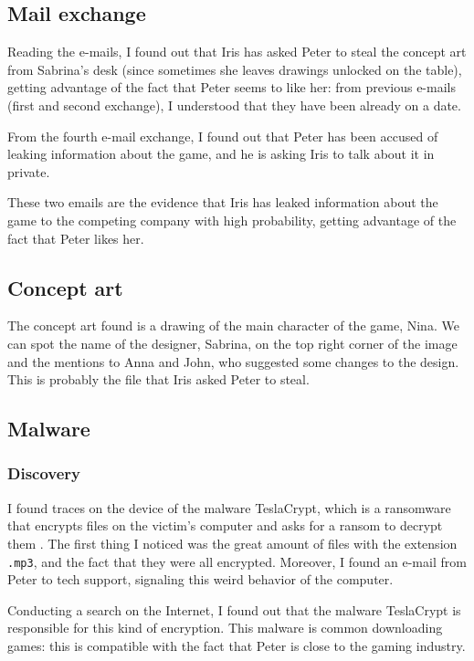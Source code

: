 \documentclass[12pt]{article}
\begin{document}
\subsection{Mail exchange}
\label{sec:mail}

Reading the e-mails, I found out that Iris has asked Peter to steal the concept art from Sabrina's desk (since sometimes she leaves drawings unlocked on the table), getting advantage of the fact that Peter seems to like her: from previous e-mails (first and second exchange), I understood that they have been already on a date.

From the fourth e-mail exchange, I found out that Peter has been accused of leaking information about the game, and he is asking Iris to talk about it in private.

These two emails are the evidence that Iris has leaked information about the game to the competing company with high probability, getting advantage of the fact that Peter likes her.

\subsection{Concept art}
\label{sec:art}

The concept art found is a drawing of the main character of the game, Nina. We can spot the name of the designer, Sabrina, on the top right corner of the image and the mentions to Anna and John, who suggested some changes to the design. This is probably the file that Iris asked Peter to steal.

\subsection{Malware}
\label{sec:malware}

\subsubsection{Discovery}
I found traces on the device of the malware TeslaCrypt, which is a ransomware that encrypts files on the victim's computer and asks for a ransom to decrypt them \cite{teslacrypt}.
The first thing I noticed was the great amount of files with the extension \texttt{.mp3}, and the fact that they were all encrypted.
Moreover, I found an e-mail from Peter to tech support, signaling this weird behavior of the computer.

Conducting a search on the Internet, I found out that the malware TeslaCrypt is responsible for this kind of encryption. This malware is common downloading games: this is compatible with the fact that Peter is close to the gaming industry.
\end{document}
